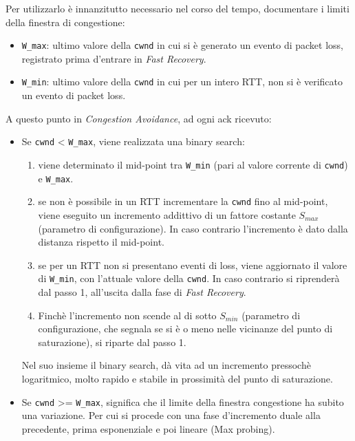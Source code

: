 Per utilizzarlo è innanzitutto necessario nel corso del tempo, documentare i limiti della finestra di congestione:

\begin{itemize}

\item \texttt{W\_max}: ultimo valore della \texttt{cwnd} in cui si è generato un evento di packet loss, registrato prima d'entrare in \textit{Fast Recovery}.
\item \texttt{W\_min}: ultimo valore della \texttt{cwnd} in cui per un intero RTT, non si è verificato un evento di packet loss.

\end{itemize}

A questo punto in \textit{Congestion Avoidance}, ad ogni ack ricevuto:

\begin{itemize}

\item Se \texttt{cwnd} < \texttt{W\_max}, viene realizzata una binary search:

\begin{enumerate}

\item viene determinato il mid-point tra \texttt{W\_min} (pari al valore corrente di \texttt{cwnd}) e \texttt{W\_max}.

\item se non è possibile in un RTT incrementare la \texttt{cwnd} fino al mid-point, viene eseguito un incremento addittivo di un fattore costante $S_{max}$ (parametro di configurazione). In caso contrario l'incremento è dato dalla distanza rispetto il mid-point.

\item se per un RTT non si presentano eventi di loss, viene aggiornato il valore di \texttt{W\_min}, con l'attuale valore della \texttt{cwnd}. In caso contrario si riprenderà dal passo 1, all'uscita dalla fase di \textit{Fast Recovery}.

\item Finchè l'incremento non scende al di sotto  $S_{min}$ (parametro di configurazione, che segnala se si è o meno nelle vicinanze del punto di saturazione), si riparte dal passo 1.

\end{enumerate}

Nel suo insieme il binary search, dà vita ad un incremento pressochè logaritmico, molto rapido e stabile in prossimità del punto di saturazione.

\item Se \texttt{cwnd} >= \texttt{W\_max}, significa che il limite della finestra congestione ha subito una variazione. Per cui si procede con una fase d'incremento duale alla precedente, prima esponenziale e poi lineare
(Max probing).

\end{itemize}

